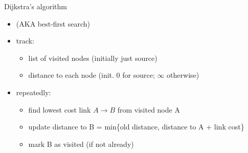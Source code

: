 \begin{frame}{Dijkstra's algorithm}
    \begin{itemize}
    \item (AKA best-first search)
    \vspace{.5cm}
    \item track:
        \begin{itemize}
        \item list of visited nodes (initially just source)
        \item distance to each node (init. $0$ for source; $\infty$ otherwise)
        \end{itemize}
    \item repeatedly:
        \begin{itemize}
        \item find lowest cost link $A\rightarrow B$ from visited node A
        \item update distance to B = min\{old distance, distance to A + link cost\}
        \item mark B as visited (if not already)
        \end{itemize}
    \end{itemize}
\end{frame}

